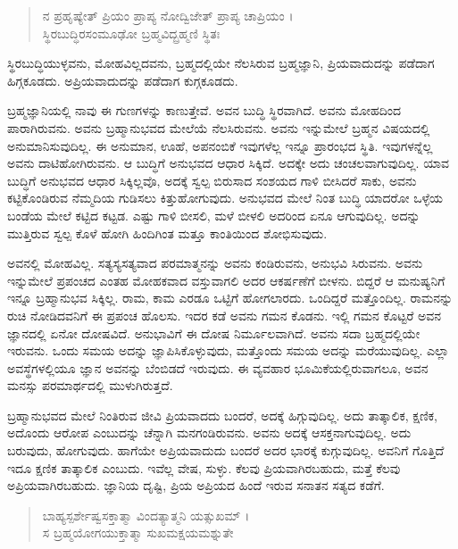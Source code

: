 \begin{verse}
ನ ಪ್ರಹೃಷ್ಯೇತ್ ಪ್ರಿಯಂ ಪ್ರಾಪ್ಯ ನೋದ್ವಿಜೇತ್ ಪ್ರಾಪ್ಯ ಚಾಪ್ರಿಯಂ ।\\ಸ್ಥಿರಬುದ್ಧಿರಸಂಮೂಢೋ ಬ್ರಹ್ಮವಿದ್ಬ್ರಹ್ಮಣಿ ಸ್ಥಿತಃ 
\end{verse}

{\small ಸ್ಥಿರಬುದ್ಧಿಯುಳ್ಳವನು, ಮೋಹವಿಲ್ಲದವನು, ಬ್ರಹ್ಮದಲ್ಲಿಯೇ ನೆಲಸಿರುವ ಬ್ರಹ್ಮಜ್ಞಾನಿ, ಪ್ರಿಯವಾದುದನ್ನು ಪಡೆದಾಗ ಹಿಗ್ಗಕೂಡದು. ಅಪ್ರಿಯವಾದುದನ್ನು ಪಡೆದಾಗ ಕುಗ್ಗಕೂಡದು.}

ಬ್ರಹ್ಮಜ್ಞಾನಿಯಲ್ಲಿ ನಾವು ಈ ಗುಣಗಳನ್ನು ಕಾಣುತ್ತೇವೆ. ಅವನ ಬುದ್ಧಿ ಸ್ಥಿರವಾಗಿದೆ. ಅವನು ಮೋಹದಿಂದ ಪಾರಾಗಿರುವನು. ಅವನು ಬ್ರಹ್ಮಾನುಭವದ ಮೇಲೆಯೆ ನೆಲಸಿರುವನು. ಅವನು ಇನ್ನುಮೇಲೆ ಬ್ರಹ್ಮನ ವಿಷಯದಲ್ಲಿ ಅನುಮಾನಿಸುವುದಿಲ್ಲ. ಈ ಅನುಮಾನ, ಊಹೆ, ಅಪನಂಬಿಕೆ ಇವುಗಳೆಲ್ಲ ಇನ್ನೂ ಪ್ರಾರಂಭದ ಸ್ಥಿತಿ. ಇವುಗಳನ್ನೆಲ್ಲ ಅವನು ದಾಟಿಹೋಗಿರುವನು. ಆ ಬುದ್ಧಿಗೆ ಅನುಭವದ ಆಧಾರ ಸಿಕ್ಕಿದೆ. ಅದಕ್ಕೇ ಅದು ಚಂಚಲವಾಗುವುದಿಲ್ಲ. ಯಾವ ಬುದ್ಧಿಗೆ ಅನುಭವದ ಆಧಾರ ಸಿಕ್ಕಿಲ್ಲವೊ, ಅದಕ್ಕೆ ಸ್ವಲ್ಪ ಬಿರುಸಾದ ಸಂಶಯದ ಗಾಳಿ ಬೀಸಿದರೆ ಸಾಕು, ಅವನು ಕಟ್ಟಿಕೊಂಡಿರುವ ನೆಮ್ಮದಿಯ ಗುಡಿಸಲು ಕಿತ್ತುಹೋಗುವುದು. ಅನುಭವದ ಮೇಲೆ ನಿಂತ ಬುದ್ಧಿ ಯಾದರೋ ಒಳ್ಳೆಯ ಬಂಡೆಯ ಮೇಲೆ ಕಟ್ಟಿದ ಕಟ್ಟಡ. ಎಷ್ಟು ಗಾಳಿ ಬೀಸಲಿ, ಮಳೆ ಬೀಳಲಿ ಅದರಿಂದ ಏನೂ ಆಗುವುದಿಲ್ಲ. ಅದನ್ನು ಮುತ್ತಿರುವ ಸ್ವಲ್ಪ ಕೊಳೆ ಹೋಗಿ ಹಿಂದಿಗಿಂತ ಮತ್ತೂ ಕಾಂತಿಯಿಂದ ಶೋಭಿಸುವುದು.

ಅವನಲ್ಲಿ ಮೋಹವಿಲ್ಲ. ಸತ್ಯಸ್ಯಸತ್ಯವಾದ ಪರಮಾತ್ಮನನ್ನು ಅವನು ಕಂಡಿರುವನು, ಅನುಭವಿ ಸಿರುವನು. ಅವನು ಇನ್ನುಮೇಲೆ ಪ್ರಪಂಚದ ಎಂತಹ ಮೋಹಕವಾದ ವಸ್ತುವಾಗಲಿ ಅದರ ಆಕರ್ಷಣೆಗೆ ಬೀಳನು. ಬಿದ್ದರೆ ಆ ಮನುಷ್ಯನಿಗೆ ಇನ್ನೂ ಬ್ರಹ್ಮಾನುಭವ ಸಿಕ್ಕಿಲ್ಲ. ರಾಮ, ಕಾಮ ಎರಡೂ ಒಟ್ಟಿಗೆ ಹೋಗಲಾರದು. ಒಂದಿದ್ದರೆ ಮತ್ತೊಂದಿಲ್ಲ. ರಾಮನನ್ನು ರುಚಿ ನೋಡಿದವನಿಗೆ ಈ ಪ್ರಪಂಚ ಹೊಲಸು. ಇದರ ಕಡೆ ಅವನು ಗಮನ ಕೊಡನು. ಇಲ್ಲಿ ಗಮನ ಕೊಟ್ಟರೆ ಅವನ ಜ್ಞಾನದಲ್ಲಿ ಏನೋ ದೋಷವಿದೆ. ಅನುಭಾವಿಗೆ ಈ ದೋಷ ನಿರ್ಮೂಲವಾಗಿದೆ. ಅವನು ಸದಾ ಬ್ರಹ್ಮದಲ್ಲಿಯೇ ಇರುವನು. ಒಂದು ಸಮಯ ಅದನ್ನು ಜ್ಞಾಪಿಸಿಕೊಳ್ಳುವುದು, ಮತ್ತೊಂದು ಸಮಯ ಅದನ್ನು ಮರೆಯುವುದಿಲ್ಲ. ಎಲ್ಲಾ ಅವಸ್ಥೆಗಳಲ್ಲಿಯೂ ಜ್ಞಾನ ಅವನನ್ನು ಬೆಂಬಿಡದೆ ಇರುವುದು. ಈ ವ್ಯವಹಾರ ಭೂಮಿಕೆಯಲ್ಲಿರುವಾಗಲೂ, ಅವನ ಮನಸ್ಸು ಪರಮಾರ್ಥದಲ್ಲಿ ಮುಳುಗಿರುತ್ತದೆ.

ಬ್ರಹ್ಮಾನುಭವದ ಮೇಲೆ ನಿಂತಿರುವ ಜೀವಿ ಪ್ರಿಯವಾದದು ಬಂದರೆ, ಅದಕ್ಕೆ ಹಿಗ್ಗುವುದಿಲ್ಲ. ಅದು ತಾತ್ಕಾಲಿಕ, ಕ್ಷಣಿಕ, ಅದೊಂದು ಆರೋಪ ಎಂಬುದನ್ನು ಚೆನ್ನಾಗಿ ಮನಗಂಡಿರುವನು. ಅವನು ಅದಕ್ಕೆ ಆಸಕ್ತನಾಗುವುದಿಲ್ಲ. ಅದು ಬರುವುದು, ಹೋಗುವುದು. ಹಾಗೆಯೇ ಅಪ್ರಿಯವಾದುದು ಬಂದರೆ ಅದರ ಭಾರಕ್ಕೆ ಕುಗ್ಗುವುದಿಲ್ಲ. ಅವನಿಗೆ ಗೊತ್ತಿದೆ ಇದೂ ಕ್ಷಣಿಕ ತಾತ್ಕಾಲಿಕ ಎಂಬುದು. ಇವೆಲ್ಲ ವೇಷ, ಸುಳ್ಳು. ಕೆಲವು ಪ್ರಿಯವಾಗಿರಬಹುದು, ಮತ್ತೆ ಕೆಲವು ಅಪ್ರಿಯವಾಗಿರಬಹುದು. ಜ್ಞಾನಿಯ ದೃಷ್ಟಿ, ಪ್ರಿಯ ಅಪ್ರಿಯದ ಹಿಂದೆ ಇರುವ ಸನಾತನ ಸತ್ಯದ ಕಡೆಗೆ.

\begin{verse}
ಬಾಹ್ಯಸ್ಪರ್ಶೇಷ್ವಸಕ್ತಾತ್ಮಾ ವಿಂದತ್ಯಾತ್ಮನಿ ಯತ್ಸುಖಮ್ ।\\ಸ ಬ್ರಹ್ಮಯೋಗಯುಕ್ತಾತ್ಮಾ ಸುಖಮಕ್ಷಯಮಶ್ನುತೇ 
\end{verse}

